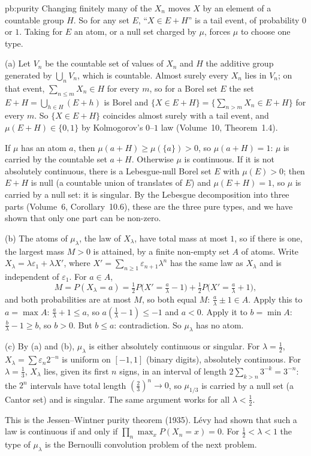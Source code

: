 \begin{solution}{pb:purity}
\idea Changing finitely many of the $X_n$ moves $X$ by an element of a countable group $H$. So for any set $E$, ``$X\in E+H$'' is a tail event, of probability $0$ or $1$.
Taking for $E$ an atom, or a null set charged by $\mu$, forces $\mu$ to choose one type.

\writeup (a) Let $V_n$ be the countable set of values of $X_n$ and $H$ the additive group generated by $\bigcup_nV_n$, which is countable. Almost surely every $X_n$ lies
in $V_n$; on that event, $\sum_{n\le m}X_n\in H$ for every $m$, so for a Borel set $E$ the set $E+H=\bigcup_{h\in H}(E+h)$ is Borel and
$\{X\in E+H\}=\bigl\{\sum_{n>m}X_n\in E+H\bigr\}$ for every $m$. So $\{X\in E+H\}$ coincides almost surely with a tail event, and $\mu(E+H)\in\{0,1\}$ by Kolmogorov's $0$--$1$
law (Volume~10, Theorem~1.4).

If $\mu$ has an atom $a$, then $\mu(a+H)\ge\mu(\{a\})>0$, so $\mu(a+H)=1$: $\mu$ is carried by the countable set $a+H$. Otherwise $\mu$ is continuous. If it is not absolutely
continuous, there is a Lebesgue-null Borel set $E$ with $\mu(E)>0$; then $E+H$ is null (a countable union of translates of $E$) and $\mu(E+H)=1$, so $\mu$ is carried by a
null set: it is singular. By the Lebesgue decomposition into three parts (Volume~6, Corollary~10.6), these are the three pure types, and we have shown that only one part can
be non-zero.

(b) The atoms of $\mu_\lambda$, the law of $X_\lambda$, have total mass at most $1$, so if there is one, the largest mass $M>0$ is attained, by a finite non-empty set $A$
of atoms. Write $X_\lambda=\lambda\varepsilon_1+\lambda X'$, where $X'=\sum_{n\ge1}\varepsilon_{n+1}\lambda^n$ has the same law as $X_\lambda$ and is independent of $\varepsilon_1$. For
$a\in A$,
\[
M=P(X_\lambda=a)=\tfrac12P\bigl(X'=\tfrac a\lambda-1\bigr)+\tfrac12P\bigl(X'=\tfrac a\lambda+1\bigr),
\]
and both probabilities are at most $M$, so both equal $M$: $\frac a\lambda\pm1\in A$. Apply this to $a=\max A$: $\frac a\lambda+1\le a$, so $a(\frac1\lambda-1)\le-1$ and $a<0$. Apply it to
$b=\min A$: $\frac b\lambda-1\ge b$, so $b>0$. But $b\le a$: contradiction. So $\mu_\lambda$ has no atom.

(c) By (a) and (b), $\mu_\lambda$ is either absolutely continuous or singular. For $\lambda=\frac12$, $X_\lambda=\sum\varepsilon_n2^{-n}$ is uniform on $[-1,1]$ (binary digits),
absolutely continuous. For $\lambda=\frac13$, $X_\lambda$ lies, given its first $n$ signs, in an interval of length $2\sum_{k>n}3^{-k}=3^{-n}$: the $2^n$ intervals have total length
$(\frac23)^n\to0$, so $\mu_{1/3}$ is carried by a null set (a Cantor set) and is singular. The same argument works for all $\lambda<\frac12$.

\leads This is the Jessen--Wintner purity theorem (1935). Lévy had shown that such a law is continuous if and only if $\prod_n\max_xP(X_n=x)=0$. For $\frac12<\lambda<1$
the type of $\mu_\lambda$ is the Bernoulli convolution problem of the next problem.
\end{solution}

